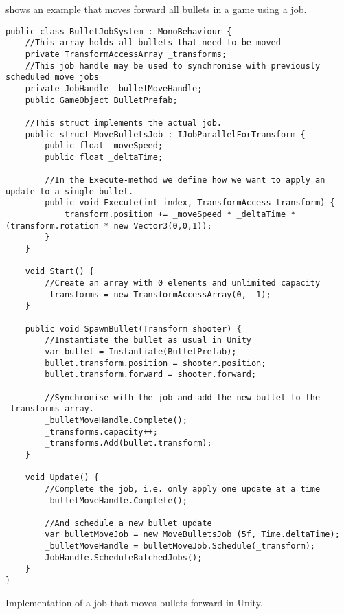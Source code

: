  shows an example that moves forward all bullets in a game using a job.
\begin{listing}
\begin{verbatim}
public class BulletJobSystem : MonoBehaviour {
    //This array holds all bullets that need to be moved
    private TransformAccessArray _transforms;
    //This job handle may be used to synchronise with previously scheduled move jobs
    private JobHandle _bulletMoveHandle;
    public GameObject BulletPrefab;

    //This struct implements the actual job.
    public struct MoveBulletsJob : IJobParallelForTransform {
        public float _moveSpeed;
        public float _deltaTime;

        //In the Execute-method we define how we want to apply an update to a single bullet.
        public void Execute(int index, TransformAccess transform) {
            transform.position += _moveSpeed * _deltaTime * (transform.rotation * new Vector3(0,0,1));
        }
    }

    void Start() {
        //Create an array with 0 elements and unlimited capacity
        _transforms = new TransformAccessArray(0, -1);
    }

    public void SpawnBullet(Transform shooter) {
        //Instantiate the bullet as usual in Unity
        var bullet = Instantiate(BulletPrefab);
        bullet.transform.position = shooter.position;
        bullet.transform.forward = shooter.forward;

        //Synchronise with the job and add the new bullet to the _transforms array.
        _bulletMoveHandle.Complete();
        _transforms.capacity++;
        _transforms.Add(bullet.transform);
    }

    void Update() {
        //Complete the job, i.e. only apply one update at a time
        _bulletMoveHandle.Complete();

        //And schedule a new bullet update
        var bulletMoveJob = new MoveBulletsJob (5f, Time.deltaTime);
        _bulletMoveHandle = bulletMoveJob.Schedule(_transform);
        JobHandle.ScheduleBatchedJobs();
    }
}
\end{verbatim}
\caption{Implementation of a job that moves bullets forward in Unity.} \label{lst:unity:job:example}
\end{listing}

